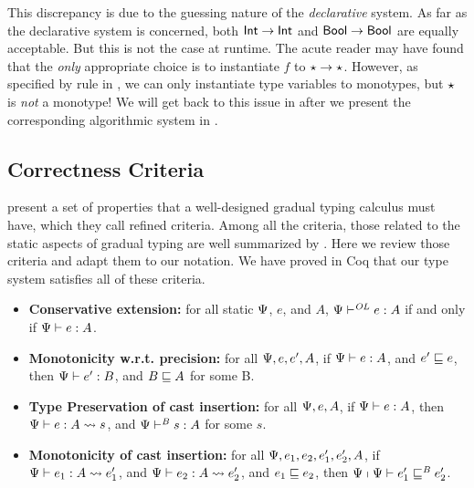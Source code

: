 This discrepancy is due to the guessing nature of the \textit{declarative}
system. As far as the declarative system is concerned, both $\mathsf{Int} \to \mathsf{Int}$ and
$\mathsf{Bool} \to \mathsf{Bool}$ are equally acceptable. But this is not the case at runtime.
The acute reader may have found that the \textit{only} appropriate choice is to
instantiate $f$ to $\star \to \star$. However, as specified by rule
 in , we can only instantiate type variables
to monotypes, but $\star$ is \textit{not} a monotype! We will get back to
this issue in  after we present the corresponding
algorithmic system in .


\subsection{Correctness Criteria}
\label{sec:criteria}

\citet{siek2015refined} present a set of properties that a well-designed gradual
typing calculus must have, which they call refined criteria. Among all the
criteria, those related to the static aspects of gradual typing are well
summarized by \citet{cimini2016gradualizer}. Here we review those criteria and
adapt them to our notation. We have proved in Coq that our type system satisfies
all of these criteria.

\begin{clemma}\leavevmode
  \begin{itemize}
  \item \textbf{Conservative extension:}
    for all static $\Psi$, $e$, and $A$,
    $\Psi \vdash^{\mathit{OL}} e : A $ if and only if $\Psi \vdash e : A$.
  \item \textbf{Monotonicity w.r.t. precision:}
    for all $\Psi, e, e', A$,
    if $\Psi \vdash e : A$,
    and $e' \sqsubseteq e$,
    then $\Psi \vdash e' : B$,
    and $B \sqsubseteq A$ for some B.
  \item \textbf{Type Preservation of cast insertion:}
    for all $\Psi, e, A$,
    if $\Psi \vdash e : A$,
    then $\Psi \vdash e : A \rightsquigarrow{s}$,
    and $\Psi \vdash^{\mathit{B}} s : A$ for some $s$.
  \item \textbf{Monotonicity of cast insertion:}
    for all $\Psi, e_1, e_2, e_1', e_2', A$,
    if $\Psi \vdash e_1 : A \rightsquigarrow{e}_1'$,
    and $\Psi \vdash e_2 : A \rightsquigarrow{e}_2'$,
    and $e_1 \sqsubseteq e_2$,
    then $\Psi \shortmid \Psi \vdash e_1' \sqsubseteq^{\mathit{B}} e_2'$.
  \end{itemize}
\end{clemma}

